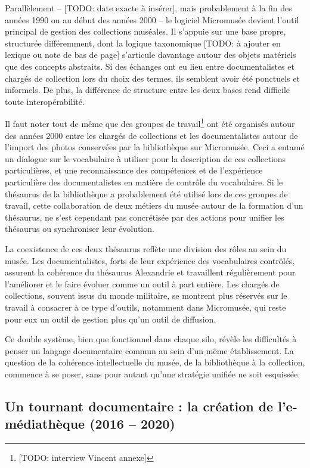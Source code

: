 Parallèlement – [TODO: date exacte à insérer], mais probablement à la fin des années 1990 ou au début des années 2000 – le logiciel Micromusée devient l’outil principal de gestion des collections muséales. Il s’appuie sur une base propre, structurée différemment, dont la logique taxonomique [TODO: à ajouter en lexique ou note de bas de page] s’articule davantage autour des objets matériels que des concepts abstraits. Si des échanges ont eu lieu entre documentalistes et chargés de collection lors du choix des termes, ils semblent avoir été ponctuels et informels. De plus, la différence de structure entre les deux bases rend difficile toute interopérabilité.

Il faut noter tout de même que des groupes de travail\footnote{[TODO: interview Vincent annexe]}  ont été organisés autour des années 2000 entre les chargés de collections et les documentalistes autour de l'import des photos conservées par la bibliothèque sur Micromusée. Ceci a entamé un dialogue sur le vocabulaire à utiliser pour la description de ces collections particulières, et une reconnaissance des compétences et de l'expérience particulière des documentalistes en matière de contrôle du vocabulaire. Si le thésaurus de la bibliothèque a probablement été utilisé lors de ces groupes de travail, cette collaboration de deux métiers du musée autour de la formation d'un thésaurus, ne s'est cependant pas concrétisée par des actions pour unifier les thésaurus ou synchroniser leur évolution.

La coexistence de ces deux thésaurus reflète une division des rôles au sein du musée. Les documentalistes, forts de leur expérience des vocabulaires contrôlés, assurent la cohérence du thésaurus Alexandrie et travaillent régulièrement pour l'améliorer et le faire évoluer comme un outil à part entière. Les chargés de collections, souvent issus du monde militaire, se montrent plus réservés sur le travail à consacrer à ce type d'outils, notamment dans Micromusée, qui reste pour eux un outil de gestion plus qu’un outil de diffusion.

Ce double système, bien que fonctionnel dans chaque silo, révèle les difficultés à penser un langage documentaire commun au sein d’un même établissement. La question de la cohérence intellectuelle du musée, de la bibliothèque à la collection, commence à se poser, sans pour autant qu’une stratégie unifiée ne soit esquissée.

\subsection{Un tournant documentaire : la création de l’e-médiathèque (2016 – 2020)}

